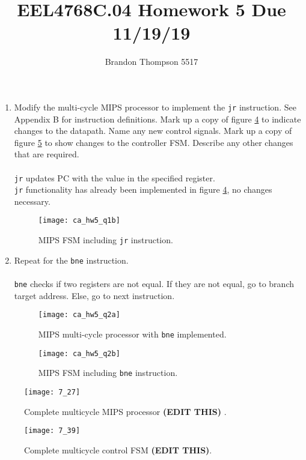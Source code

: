 \documentclass[a4paper]{article}
\begin{document}
	\title{EEL4768C.04 Homework 5 Due 11/19/19}
	\author{Brandon Thompson 5517}
	\maketitle

	\begin{enumerate}
		\item Modify the multi-cycle MIPS processor to implement the \verb|jr| instruction.
			See Appendix B for instruction definitions. Mark up a copy of figure
			\ref{fig:c_multicycle_processor} to indicate changes to the datapath. Name any new
			control signals. Mark up a copy of figure \ref{fig:c_multicycle_fsm} to show changes
			to the controller FSM. Describe any other changes that are required.\\
			\\
			\texttt{jr} updates PC with the value in the specified register.\\
			\verb|jr| functionality has already been implemented in figure \ref{fig:c_multicycle_processor}, no changes necessary.
			\begin{figure}[ht!]
				\centering
				\texttt{[image: ca\_hw5\_q1b]}
				\caption{MIPS FSM including \texttt{jr} instruction.}
				\label{fig:ca_hw5_q1b}
			\end{figure}
			
			\clearpage
		\item Repeat for the \verb|bne| instruction.\\
			\\
			\texttt{bne} checks if two registers are not equal. If they are not equal,
			go to branch target address. Else, go to next instruction.
			\begin{figure}[ht]
				\centering
				\texttt{[image: ca\_hw5\_q2a]}
				\caption{MIPS multi-cycle processor with \texttt{bne} implemented.}
				\label{fig:ca_hw5_q2a}
			\end{figure}
			\begin{figure}[ht]
				\centering
				\texttt{[image: ca\_hw5\_q2b]}
				\caption{MIPS FSM including \texttt{bne} instruction.}
				\label{fig:ca_hw5_q2b}
			\end{figure}
	\end{enumerate}
\clearpage
	\begin{figure}[ht!]
		\centering
		\texttt{[image: 7\_27]}
		\caption{Complete multicycle MIPS processor \textbf{(EDIT THIS)} .}
		\label{fig:c_multicycle_processor}
	\end{figure}
	\begin{figure}[ht!]
		\centering
		\texttt{[image: 7\_39]}
		\caption{Complete multicycle control FSM \textbf{(EDIT THIS)}.}
		\label{fig:c_multicycle_fsm}
	\end{figure}
\end{document}
